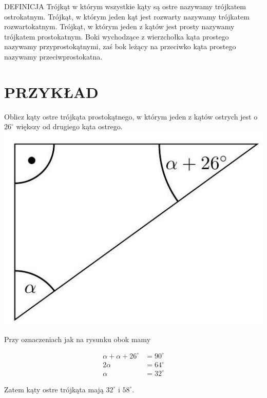\documentclass[10pt]{article}
\begin{document}
DEFINICJA Trójkąt w którym wszystkie kąty są ostre nazywamy trójkatem ostrokatnym. Trójkąt, w którym jeden kąt jest rozwarty nazywamy trójkatem rozwartokatnym. Trójkąt, w którym jeden z kątów jest prosty nazywamy trójkatem prostokatnym. Boki wychodzące z wierzchołka kąta prostego nazywamy przyprostokątnymi, zaś bok leżący na przeciwko kąta prostego nazywamy przeciwprostokatna.

\section*{PRZYKŁAD}
Oblicz kąty ostre trójkąta prostokątnego, w którym jeden z kątów ostrych jest o \(26^{\circ}\) większy od drugiego kąta ostrego.\\
\includegraphics[max width=\textwidth, center]{2024_11_21_71f62bd117d375398909g-018}

Przy oznaczeniach jak na rysunku obok mamy

\[
\begin{aligned}
\alpha+\alpha+26^{\circ} & =90^{\circ} \\
2 \alpha & =64^{\circ} \\
\alpha & =32^{\circ}
\end{aligned}
\]

Zatem kąty ostre trójkąta mają \(32^{\circ}\) i \(58^{\circ}\).
\end{document}
